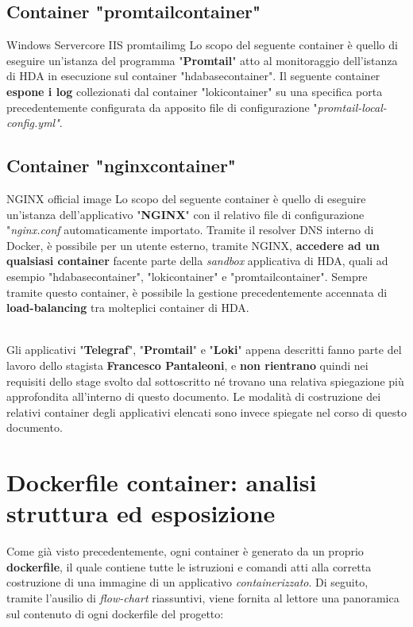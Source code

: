 \subsection{Container "promtailcontainer"}
\begin{namespacedesc}
	 {Windows Servercore IIS}
	 {promtailimg}
	 {Lo scopo del seguente container è quello di eseguire un'istanza del programma "\textbf{Promtail}" atto al monitoraggio dell'istanza di HDA in esecuzione sul container "hdabasecontainer". Il seguente container \textbf{espone i log} collezionati dal container "lokicontainer" su una specifica porta precedentemente configurata da apposito file di configurazione "\textit{promtail-local-config.yml"}}.
\end{namespacedesc}	

\subsection{Container "nginxcontainer"}
\begin{namespacedesc}
	 {NGINX official image}
	 {Lo scopo del seguente container è quello di eseguire un'istanza dell'applicativo "\textbf{NGINX}" con il relativo file di configurazione "\textit{nginx.conf} automaticamente importato. Tramite il resolver DNS interno di Docker, è possibile per un utente esterno, tramite NGINX, \textbf{accedere ad un qualsiasi container} facente parte della \textit{sandbox} applicativa di HDA, quali ad esempio "hdabasecontainer", "lokicontainer" e "promtailcontainer". Sempre tramite questo container, è possibile la gestione precedentemente accennata di \textbf{load-balancing} tra molteplici container di HDA.}
\end{namespacedesc}
\\
Gli applicativi "\textbf{Telegraf}", "\textbf{Promtail}" e "\textbf{Loki}" appena descritti fanno parte del lavoro dello stagista \textbf{Francesco Pantaleoni}, e \textbf{non rientrano} quindi nei requisiti dello stage svolto dal sottoscritto né trovano una relativa spiegazione più approfondita all'interno di questo documento. Le modalità di costruzione dei relativi container degli applicativi elencati sono invece spiegate nel corso di questo documento.

\newpage	

\section{Dockerfile container: analisi struttura ed esposizione}
Come già visto precedentemente, ogni container è generato da un proprio \textbf{dockerfile}, il quale contiene tutte le istruzioni e comandi atti alla corretta costruzione di una immagine di un applicativo \textit{containerizzato}.
Di seguito, tramite l'ausilio di \textit{\gls{flow-chart}} riassuntivi, viene fornita al lettore una panoramica sul contenuto di ogni dockerfile del progetto:
